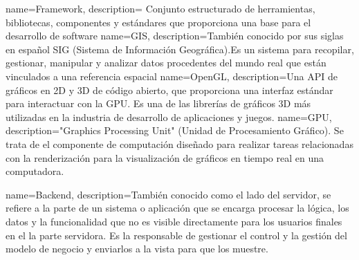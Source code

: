 \documentclass[a4paper, 11pt]{book}
\begin{document}
{
    name=Framework,
    description={
    Conjunto estructurado de herramientas, bibliotecas, componentes y estándares que proporciona una base para el desarrollo de software
    }
}
{
    name=GIS,
    description={También conocido por sus siglas en español SIG (Sistema de Información Geográfica).Es un sistema para recopilar, gestionar, manipular y analizar datos procedentes del mundo real que están vinculados a una referencia espacial}
}
{
    name=OpenGL,
    description={Una API de gráficos en 2D y 3D de código abierto, que proporciona una interfaz estándar para interactuar con la GPU. Es una de las librerías de gráficos 3D más utilizadas en la industria de desarrollo de aplicaciones y juegos.}
}
{
    name=GPU,
    description={"Graphics Processing Unit" (Unidad de Procesamiento Gráfico). Se trata de el componente de computación diseñado para realizar tareas relacionadas con la renderización para la visualización de gráficos en tiempo real en una computadora.}
}

{
    name=Backend,
    description={También conocido como el lado del servidor, se refiere a la parte de un sistema o aplicación que se encarga procesar la lógica, los datos y la funcionalidad que no es visible directamente para los usuarios finales en el la parte servidora. Es la responsable de gestionar el control y la gestión del modelo de negocio y enviarlos a la vista para que los muestre.}
}
\printglossaries
\end{document}
